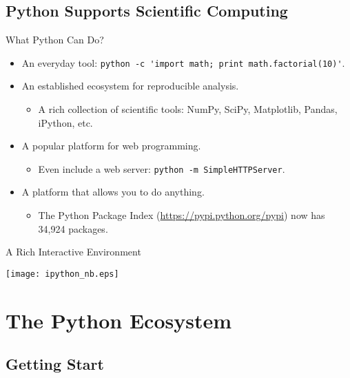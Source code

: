 \documentclass[dvips,xcolor=pst,14pt]{beamer}
\begin{document}
\subsection{
Python Supports Scientific Computing
}

\begin{frame}[fragile]{
%
What Python Can Do?
%
}
\begin{itemize}
  \item An everyday tool:
  {\small \verb+python -c 'import math; print math.factorial(10)'+}.
  \item An established ecosystem for reproducible analysis.
  \begin{itemize}
    \item A rich collection of scientific tools: NumPy, SciPy, Matplotlib,
    Pandas, iPython, etc.
  \end{itemize}
  \item A popular platform for web programming.
  \begin{itemize}
    \item Even include a web server: {\small \verb+python -m SimpleHTTPServer+}.
  \end{itemize}
  \item A platform that allows you to do anything.
  \begin{itemize}
    \item The Python Package Index (\url{https://pypi.python.org/pypi}) now has
    34,924 packages.
  \end{itemize}
\end{itemize}
\end{frame}

\begin{frame}{
%
A Rich Interactive Environment
%
}
\begin{center}
  \texttt{[image: ipython\_nb.eps]}
\end{center}
\end{frame}

\section{
The Python Ecosystem
}

\subsection{
Getting Start
}
\end{document}
